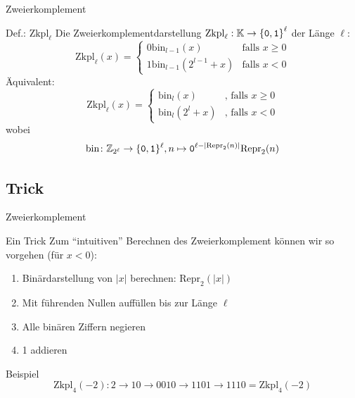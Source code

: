 \begin{frame}{Zweierkomplement}
	\begin{block}{Def.: $\text{Zkpl}_\ell$}
		Die Zweierkomplementdarstellung $ \text{Zkpl}_\ell: \mathbb{K} \to \left\{ \texttt{0}, \texttt{1} \right\}^\ell$ der Länge $\ell$:
		$$\text{Zkpl}_\ell(x) = \begin{cases} 0 \text{bin}_{l-1}(x) & \text{falls } x \geq 0 \\ 1 \text{bin}_{l-1}(2^{l-1}+x) & \text{falls } x < 0\end{cases}$$
		Äquivalent:
		$$\text{Zkpl}_\ell(x) = \begin{cases} \text{bin}_{l}(x) & \text{, falls } x \geq 0 \\ \text{bin}_{l}(2^{l}+x) & \text{, falls } x < 0\end{cases}$$
		wobei
		\[
			\text{bin} \colon \mathbb{Z}_{2^{\ell}} \to \{\texttt{0},\texttt{1}\}^{\ell}, n \mapsto \texttt{0}^{\ell- |\text{Repr}_2(n)|} \text{Repr}_2(n) 
		\]
	\end{block}
\end{frame}
\subsection{Trick}
\begin{frame}{Zweierkomplement}
	\begin{exampleblock}{Ein Trick}
		Zum ``intuitiven'' Berechnen des Zweierkomplement können wir so vorgehen (für $x < 0$):
		\begin{enumerate}
			\item Binärdarstellung von $|x|$ berechnen: $\text{Repr}_2(|x|)$
			\item Mit führenden Nullen auffüllen bis zur Länge $\ell$
			\item Alle binären Ziffern negieren
			\item 1 addieren
		\end{enumerate}
	\end{exampleblock}

	\begin{exampleblock}{Beispiel}
		$$\text{Zkpl}_4(-2): 2 \rightarrow 10 \rightarrow 0010 \rightarrow 1101 \rightarrow 1110 = \text{Zkpl}_4(-2)$$
	\end{exampleblock}
\end{frame}
